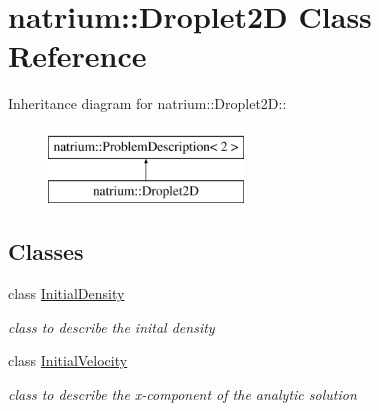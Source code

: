 \hypertarget{classnatrium_1_1Droplet2D}{
\section{natrium::Droplet2D Class Reference}
\label{classnatrium_1_1Droplet2D}
}
Inheritance diagram for natrium::Droplet2D::\begin{figure}[H]
\begin{center}
\leavevmode
\includegraphics[height=2cm]{classnatrium_1_1Droplet2D}
\end{center}
\end{figure}
\subsection*{Classes}
\begin{DoxyCompactItemize}
\item 
class \hyperlink{classnatrium_1_1Droplet2D_1_1InitialDensity}{InitialDensity}
\begin{DoxyCompactList}\small\item\em class to describe the inital density \item\end{DoxyCompactList}\item 
class \hyperlink{classnatrium_1_1Droplet2D_1_1InitialVelocity}{InitialVelocity}
\begin{DoxyCompactList}\small\item\em class to describe the x-\/component of the analytic solution \item\end{DoxyCompactList}\end{DoxyCompactItemize}

